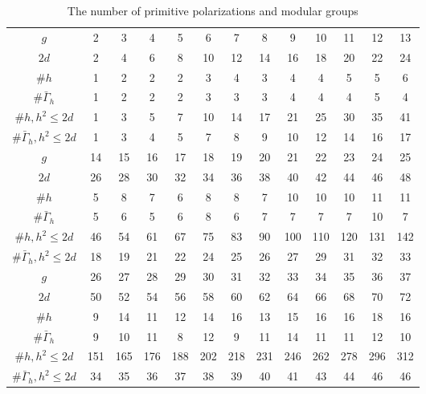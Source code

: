 \documentclass[a4paper,11pt]{article}
\begin{document}
\begin{table}
\begin{center}
\begin{tabular}{|c|cccccccccccc|}
\hline
$g$  & 2 & 3 & 4 & 5 & 6 & 7 & 8 & 9 & 10 & 11 & 12 & 13\\
$2d$  & 2 & 4 & 6 & 8 & 10 & 12 & 14 & 16 & 18 & 20 & 22 & 24\\
\hline
$\# h$  & 1 & 2 & 2 & 2 & 3 & 4 & 3 & 4 & 4 & 5 & 5 & 6\\
$\# \bar \Gamma_h$  & 1 & 2 & 2 & 2 & 3 & 3 & 3 & 4 & 4 & 4 & 5 & 4\\
$\# h, h^2 \leq 2d$  & 1 & 3 & 5 & 7 & 10 & 14 & 17 & 21 & 25 & 30 & 35 & 41\\
$\# \bar \Gamma_{h}, h^2\leq 2d$  & 1 & 3 & 4 & 5 & 7 & 8 & 9 & 10 & 12 & 14 & 16 & 17\\
\hline
\hline
$g$  & 14 & 15 & 16 & 17 & 18 & 19 & 20 & 21 & 22 & 23 & 24 & 25\\
$2d$  & 26 & 28 & 30 & 32 & 34 & 36 & 38 & 40 & 42 & 44 & 46 & 48\\
\hline
$\# h$  & 5 & 8 & 7 & 6 & 8 & 8 & 7 & 10 & 10 & 10 & 11 & 11\\
$\# \bar \Gamma_h$  & 5 & 6 & 5 & 6 & 8 & 6 & 7 & 7 & 7 & 7 & 10 & 7\\
$\# h, h^2 \leq 2d$  & 46 & 54 & 61 & 67 & 75 & 83 & 90 & 100 & 110 & 120 & 131 & 142\\
$\# \bar \Gamma_{h}, h^2\leq 2d$  & 18 & 19 & 21 & 22 & 24 & 25 & 26 & 27 & 29 & 31 & 32 & 33\\
\hline
\hline
$g$  & 26 & 27 & 28 & 29 & 30 & 31 & 32 & 33 & 34 & 35 & 36 & 37\\
$2d$  & 50 & 52 & 54 & 56 & 58 & 60 & 62 & 64 & 66 & 68 & 70 & 72\\
\hline
$\# h$  & 9 & 14 & 11 & 12 & 14 & 16 & 13 & 15 & 16 & 16 & 18 & 16\\
$\# \bar \Gamma_h$  & 9 & 10 & 11 & 8 & 12 & 9 & 11 & 14 & 11 & 11 & 12 & 10\\
$\# h, h^2 \leq 2d$  & 151 & 165 & 176 & 188 & 202 & 218 & 231 & 246 & 262 & 278 & 296 & 312\\
$\# \bar \Gamma_{h}, h^2\leq 2d$  & 34 & 35 & 36 & 37 & 38 & 39 & 40 & 41 & 43 & 44 & 46 & 46\\
\hline
\end{tabular}
\caption{The number of primitive polarizations and modular groups}\label{ListNumberPolarizationsModuli}
\end{center}
\end{table}
\end{document}

